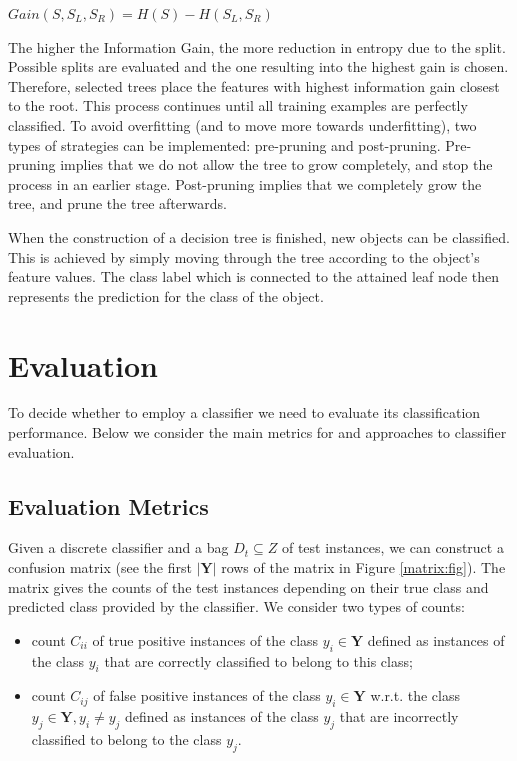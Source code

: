 \begin{center}$Gain(S,S_L,S_R) = H(S) - H(S_L,S_R)$ \end{center}

The higher the Information Gain, the more reduction in entropy due to the split. Possible splits are evaluated and the one resulting into the highest gain is chosen. Therefore, selected trees place the features with highest information gain closest to the root. This process continues until all training examples are perfectly classified. To avoid overfitting (and to move more towards underfitting), two types of strategies can be implemented: pre-pruning and post-pruning. Pre-pruning implies that we do not allow the tree to grow completely, and stop the process in an earlier stage. Post-pruning implies that we completely grow the tree, and prune the tree afterwards.  

When the construction of a decision tree is finished, new objects can be classified. This is achieved by simply moving through the tree according to the object's feature values. The class label which is connected to the attained leaf node then represents the prediction for the class of the object.~\cite{MachineLearning97Mitchell}
 

\section{Evaluation}\label{classification-evaluation}

To decide whether to employ a   classifier we need to evaluate its classification performance. Below we consider the main  metrics for and approaches to
 classifier evaluation. 


\subsection{Evaluation Metrics}\label{eval-metrics}
Given a discrete classifier and a bag $D_t \subseteq Z$ of test instances,
we can construct a confusion matrix (see the first $|\mathbf{Y}|$ rows of the
matrix in Figure \ref{matrix:fig}). The matrix gives the counts of
the test instances depending on their true class and predicted
class provided by the classifier. We consider two types of counts:
\begin{itemize}

\item count $C_{ii}$ of true positive instances of the class $y_i \in \mathbf{Y}$ defined as instances of the class $y_i$ that
are correctly classified to belong to this class;

\item count $C_{ij}$ of false positive instances of the class $y_i \in \mathbf{Y}$ w.r.t.   the class $y_j \in \mathbf{Y}, y_i \neq y_j$ defined as instances of the class $y_j$ that are incorrectly classified to belong to the class $y_j$.
\end{itemize}

